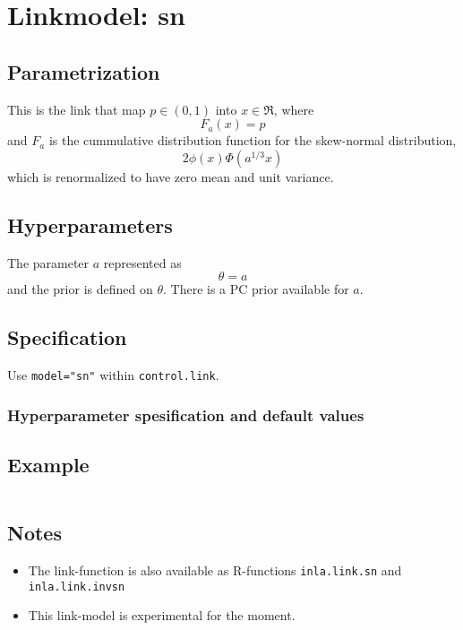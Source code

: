 \documentclass[a4paper,11pt]{article}
\begin{document}
\section*{Linkmodel: sn}

\subsection*{Parametrization}

This is the link that map $p\in (0,1)$ into $x\in\Re$, where
\begin{displaymath}
    F_{a}(x) = p
\end{displaymath}
and $F_{a}$ is the cummulative distribution function for the
skew-normal distribution,
\begin{displaymath}
    2\phi(x)\Phi(a^{1/3}x)
\end{displaymath}
which is renormalized to have zero mean and unit variance.

\subsection*{Hyperparameters}

The  parameter $a$ represented as
\begin{displaymath}
    \theta = a
\end{displaymath}
and the prior is defined on $\theta$. There is a PC prior available
for $a$.


\subsection*{Specification}

Use \texttt{model="sn"} within \texttt{control.link}.  

\subsubsection*{Hyperparameter spesification and default values}


\subsection*{Example}

\begin{verbatim}
\end{verbatim}

\subsection*{Notes}

\begin{itemize}
\item The link-function is also available as R-functions
    \texttt{inla.link.sn} and \texttt{inla.link.invsn}
\item This link-model is experimental for the moment.
\end{itemize}
\end{document}
